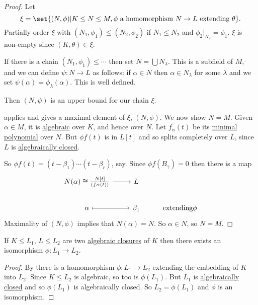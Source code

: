 \documentclass{article}
\begin{document}
\begin{proof}
    Let
    \begin{equation*}
        \xi = \set{(N, \phi) | K \leq N \leq M, \phi \text{ a homomorphism } N \to L \text{ extending } \theta}.
    \end{equation*}
    Partially order $\xi$ with $(N_1, \phi_1) \leq (N_2, \phi_2)$ if $N_1 \leq N_2$ and $\phi_2|_{N_2} = \phi_1$.
    $\xi$ is non-empty since $(K, \theta) \in \xi$.

    If there is a chain $(N_1, \phi_1) \leq \dotsb$
    then set $N = \bigcup N_\lambda$. This is a subfield of $M$, and we can define $\psi: N \to L$ as follows:
    if $\alpha \in N$ then $\alpha \in N_\lambda$ for some $\lambda$ and we set $\psi(\alpha) = \phi_\lambda(\alpha)$. This is well defined.

    Then $(N,\psi)$ is an upper bound for our chain $\xi$.

     applies and gives a maximal element of $\xi$, $(N, \phi)$.
    We now show $N=M$.
    Given $\alpha \in M$, it is \hyperlink{def:algebraic}{algebraic} over $K$, and hence over $N$.
    Let $f_\alpha(t)$ be its \hyperlink{def:minimalPoly}{minimal polynomial} over $N$.
    But $\phi f(t)$ is in $L[t]$ and so splits completely over $L$, since $L$ is \hyperlink{def:closed}{algebraically closed}.

    So $\phi f(t) = (t-\beta_1)\dotsm(t-\beta_r)$, say.
    Since $\phi f(B_\gamma) = 0$ then there is a map
    \begin{equation*}
        \begin{tikzcd}
            N(\alpha) \cong \frac{N[t]}{(f\alpha(t))} \rar & L \\
            \alpha \rar[maps to] & \beta_1 & \text{extending} \phi
        \end{tikzcd}
    \end{equation*}
    Maximality of $(N,\phi)$ implies that $N(\alpha) = N$. So $\alpha \in N$, so $N = M$.
\end{proof}
\begin{nthm}\label{thm:5.9}
    If $K \leq L_1$, $L \leq L_2$ are two \hyperlink{def:closure}{algebraic closures} of $K$ then there exists an isomorphism $\phi:L_1 \to L_2$.
\end{nthm}
\begin{proof}
    By  there is a homomorphism $\phi:L_1 \to L_2$ extending the embedding of $K$ into $L_2$.
    Since $K \leq L_2$ is algebraic, so too is $\phi(L_1)$. But $L_1$ is \hyperlink{def:closed}{algebraically closed} and so $\phi(L_1)$ is algebraically closed.
    So $L_2 = \phi(L_1)$ and $\phi$ is an isomorphism.
\end{proof}
\end{document}
